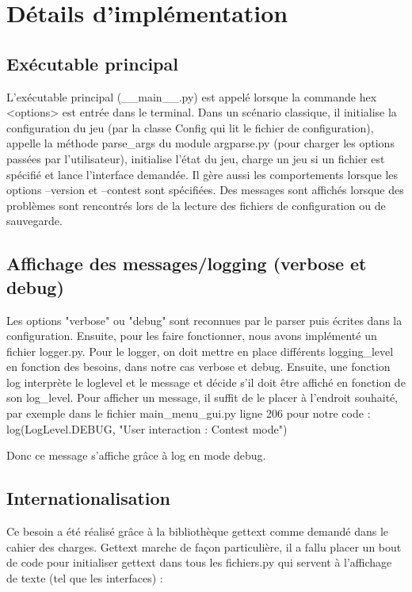 \documentclass[12pt]{article}
\begin{document}
\section{Détails d'implémentation} \label{annexe-impl}

\subsection{Exécutable principal}

L’exécutable principal (\_\_main\_\_.py) est appelé lorsque la commande hex <options> est entrée dans le terminal. Dans un scénario classique, il initialise la configuration du jeu (par la classe Config qui lit le fichier de configuration), appelle la méthode parse\_args du module argparse.py (pour charger les options passées par l’utilisateur), initialise l’état du jeu, charge un jeu si un fichier est spécifié et lance l’interface demandée. Il gère aussi les comportements lorsque les options –version et –contest sont spécifiées. Des messages sont affichés lorsque des problèmes sont rencontrés lors de la lecture des fichiers de configuration ou de sauvegarde.

\subsection{Affichage des messages/logging (verbose et debug)}

Les options "verbose" ou "debug" sont reconnues par le parser puis écrites dans la configuration. Ensuite, pour les faire fonctionner, nous avons implémenté un fichier logger.py. Pour le logger, on doit mettre en place différents logging\_level en fonction des besoins, dans notre cas verbose et debug. Ensuite, une fonction log interprète le loglevel et le message et décide s'il doit être affiché en fonction de son log\_level. Pour afficher un message, il suffit de le placer à l'endroit souhaité, par exemple dans le fichier main\_menu\_gui.py ligne 206 pour notre code :
log(LogLevel.DEBUG, "User interaction : Contest mode")

Donc ce message s'affiche grâce à log en mode debug.

\subsection{Internationalisation} \label{impl-internationalisation}
Ce besoin a été réalisé grâce à la bibliothèque gettext comme demandé dans le cahier des charges. Gettext marche de façon particulière, il a fallu placer un bout de code pour initialiser gettext dans tous les fichiers.py qui servent à l’affichage de texte (tel que les interfaces) :
\end{document}
